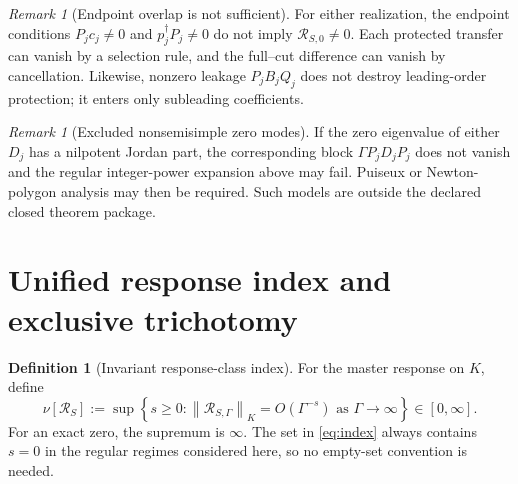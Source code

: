 \documentclass[11pt]{article}
\theoremstyle{definition}
\newtheorem{definition}[theorem]{Definition}
\theoremstyle{remark}
\newtheorem{remark}[theorem]{Remark}
\theoremstyle{plain}
\newcommand{\R}{\mathcal R}
\newcommand{\normK}[1]{\left\lVert #1\right\rVert_{K}}
\begin{document}
\begin{remark}[Endpoint overlap is not sufficient]
For either realization, the endpoint conditions $P_jc_j\ne0$ and $p_j^\dagger P_j\ne0$ do not imply $\R_{S,0}\ne0$.  Each protected transfer can vanish by a selection rule, and the full--cut difference can vanish by cancellation.  Likewise, nonzero leakage $P_jB_jQ_j$ does not destroy leading-order protection; it enters only subleading coefficients.
\end{remark}

\begin{remark}[Excluded nonsemisimple zero modes]
If the zero eigenvalue of either $D_j$ has a nilpotent Jordan part, the corresponding block $\Gamma P_jD_jP_j$ does not vanish and the regular integer-power expansion above may fail.  Puiseux or Newton-polygon analysis may then be required.  Such models are outside the declared closed theorem package.
\end{remark}

\section{Unified response index and exclusive trichotomy}

\begin{definition}[Invariant response-class index]\label{def:index}
For the master response on $K$, define
\begin{equation}\label{eq:index}
 \boxed{
 \nu[\R_S]
 :=\sup\left\{s\ge0:\normK{\R_{S,\Gamma}}=O(\Gamma^{-s})
 \text{ as }\Gamma\to\infty\right\}\in[0,\infty].}
\end{equation}
For an exact zero, the supremum is $\infty$.  The set in \eqref{eq:index} always contains $s=0$ in the regular regimes considered here, so no empty-set convention is needed.
\end{definition}
\end{document}
